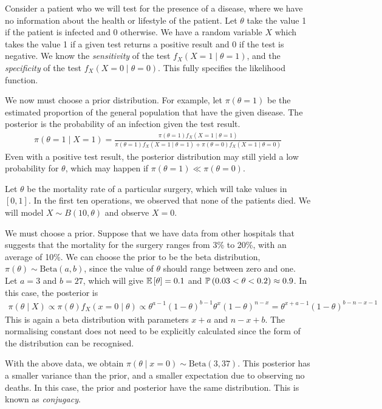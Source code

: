 \begin{example}
	Consider a patient who we will test for the presence of a disease, where we have no information about the health or lifestyle of the patient.
	Let $\theta$ take the value 1 if the patient is infected and 0 otherwise.
	We have a random variable $X$ which takes the value 1 if a given test returns a positive result and 0 if the test is negative.
	We know the \textit{sensitivity} of the test $f_X(X=1\mid \theta=1)$, and the \textit{specificity} of the test $f_X(X=0\mid \theta=0)$.
	This fully specifies the likelihood function.

	We now must choose a prior distribution.
	For example, let $\pi(\theta = 1)$ be the estimated proportion of the general population that have the given disease.
	The posterior is the probability of an infection given the test result.
	\begin{align*}
		\pi(\theta = 1 \mid X = 1) = \frac{\pi(\theta = 1) f_X(X = 1 \mid \theta = 1)}{\pi(\theta = 1) f_X(X = 1 \mid \theta = 1) + \pi(\theta = 0) f_X(X = 1 \mid \theta = 0)}
	\end{align*}
	Even with a positive test result, the posterior distribution may still yield a low probability for $\theta$, which may happen if $\pi(\theta = 1) \ll \pi(\theta = 0)$.
\end{example}
\begin{example}
	Let $\theta$ be the mortality rate of a particular surgery, which will take values in $[0,1]$.
	In the first ten operations, we observed that none of the patients died.
	We will model $X \sim B(10,\theta)$ and observe $X = 0$.

	We must choose a prior.
	Suppose that we have data from other hospitals that suggests that the mortality for the surgery ranges from 3\% to 20\%, with an average of 10\%.
	We can choose the prior to be the beta distribution, $\pi(\theta) \sim \mathrm{Beta}(a,b)$, since the value of $\theta$ should range between zero and one.
	Let $a = 3$ and $b = 27$, which will give $\mathbb{E}\left[{\theta}\right] = 0.1$ and $\mathbb{P}\left({0.03 < \theta < 0.2}\right) \approx 0.9$.
	In this case, the posterior is
	\begin{align*}
		\pi(\theta \mid X) \propto \pi(\theta) f_X(x = 0 \mid \theta) \propto \theta^{a-1} (1-\theta)^{b-1} \theta^x (1-\theta)^{n-x} = \theta^{x+a-1} (1-\theta)^{b-n-x-1}
	\end{align*}
	This is again a beta distribution with parameters $x+a$ and $n-x+b$.
	The normalising constant does not need to be explicitly calculated since the form of the distribution can be recognised.

	With the above data, we obtain $\pi(\theta \mid x = 0) \sim \mathrm{Beta}(3,37)$.
	This posterior has a smaller variance than the prior, and a smaller expectation due to observing no deaths.
	In this case, the prior and posterior have the same distribution.
	This is known as \textit{conjugacy}.
\end{example}

